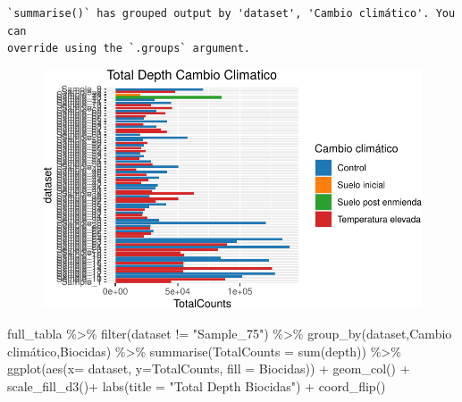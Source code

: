 \documentclass[
  letterpaper,
  DIV=11,
  numbers=noendperiod]{scrartcl}
\newenvironment{Shaded}{\begin{snugshade}}{\end{snugshade}}
\newcommand{\AttributeTok}[1]{\textcolor[rgb]{0.40,0.45,0.13}{#1}}
\newcommand{\FunctionTok}[1]{\textcolor[rgb]{0.28,0.35,0.67}{#1}}
\newcommand{\NormalTok}[1]{\textcolor[rgb]{0.00,0.23,0.31}{#1}}
\newcommand{\SpecialCharTok}[1]{\textcolor[rgb]{0.37,0.37,0.37}{#1}}
\newcommand{\StringTok}[1]{\textcolor[rgb]{0.13,0.47,0.30}{#1}}
\begin{document}
\begin{verbatim}
`summarise()` has grouped output by 'dataset', 'Cambio climático'. You can
override using the `.groups` argument.
\end{verbatim}

\begin{figure}[H]

{\centering \includegraphics{InformeNeiker_files/figure-pdf/unnamed-chunk-5-1.pdf}

}

\end{figure}

\begin{Shaded}
\begin{Highlighting}[]
\NormalTok{full\_tabla }\SpecialCharTok{\%\textgreater{}\%} \FunctionTok{filter}\NormalTok{(dataset }\SpecialCharTok{!=} \StringTok{"Sample\_75"}\NormalTok{) }\SpecialCharTok{\%\textgreater{}\%} 
  \FunctionTok{group\_by}\NormalTok{(dataset,}\StringTok{\textasciigrave{}}\AttributeTok{Cambio climático}\StringTok{\textasciigrave{}}\NormalTok{,Biocidas) }\SpecialCharTok{\%\textgreater{}\%} 
  \FunctionTok{summarise}\NormalTok{(}\AttributeTok{TotalCounts =} \FunctionTok{sum}\NormalTok{(depth)) }\SpecialCharTok{\%\textgreater{}\%} 
  \FunctionTok{ggplot}\NormalTok{(}\FunctionTok{aes}\NormalTok{(}\AttributeTok{x=}\NormalTok{ dataset, }\AttributeTok{y=}\NormalTok{TotalCounts, }\AttributeTok{fill =}\NormalTok{ Biocidas)) }\SpecialCharTok{+} 
  \FunctionTok{geom\_col}\NormalTok{() }\SpecialCharTok{+}
  \FunctionTok{scale\_fill\_d3}\NormalTok{()}\SpecialCharTok{+}
  \FunctionTok{labs}\NormalTok{(}\AttributeTok{title =} \StringTok{"Total Depth Biocidas"}\NormalTok{) }\SpecialCharTok{+}
  \FunctionTok{coord\_flip}\NormalTok{()}
\end{Highlighting}
\end{Shaded}
\end{document}
